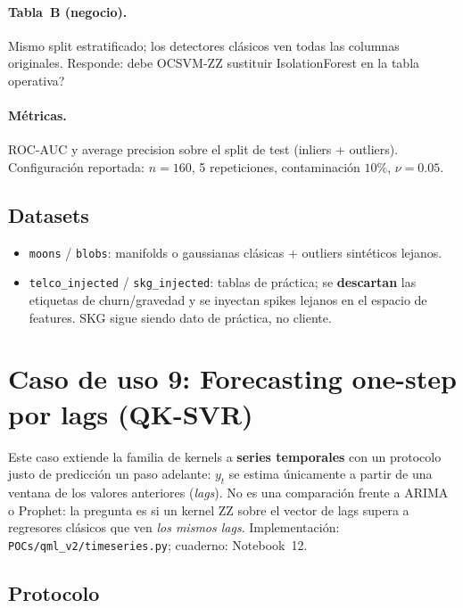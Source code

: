 \paragraph{Tabla~B (negocio).} Mismo split estratificado; los detectores clásicos ven todas las columnas originales. Responde: \textquestiondown{}debe OCSVM-ZZ sustituir IsolationForest en la tabla operativa?

\paragraph{Métricas.} ROC-AUC y average precision sobre el split de test (inliers + outliers). Configuración reportada: $n=160$, 5 repeticiones, contaminación $10\%$, $\nu=0.05$.

\subsection{Datasets}

\begin{itemize}
  \item \texttt{moons} / \texttt{blobs}: manifolds o gaussianas clásicas + outliers sintéticos lejanos.
  \item \texttt{telco\_injected} / \texttt{skg\_injected}: tablas de práctica; se \textbf{descartan} las etiquetas de churn/gravedad y se inyectan spikes lejanos en el espacio de features. SKG sigue siendo dato de práctica, no cliente.
\end{itemize}

\section{Caso de uso 9: Forecasting one-step por lags (QK-SVR)}
\label{sec:caso9_timeseries}

Este caso extiende la familia de kernels a \textbf{series temporales} con un protocolo justo de predicción un paso adelante: $y_t$ se estima únicamente a partir de una ventana de los valores anteriores (\textit{lags}). No es una comparación frente a ARIMA o Prophet: la pregunta es si un kernel ZZ sobre el vector de lags supera a regresores clásicos que ven \emph{los mismos lags}. Implementación: \texttt{POCs/qml\_v2/timeseries.py}; cuaderno: Notebook~12.

\subsection{Protocolo}

